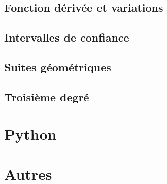 \documentclass[a4paper,12pt]{book}
\begin{document}
\chapter{Fonction dérivée et variations}


\chapter{Intervalles de confiance}


\chapter{Suites géométriques}


\chapter{Troisième degré}


\part{Python}


\part{Autres}

%







\printnomenclature

\printindex
\end{document}

